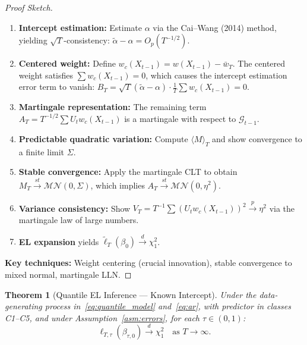 \documentclass[11pt,a4paper]{article}
\newtheorem{theorem}{Theorem}[section]
\theoremstyle{definition}
\theoremstyle{remark}
\begin{document}
\begin{proof}[Proof Sketch]
\begin{enumerate}[leftmargin=*, label=\textbf{\arabic*}.]
    \item \textbf{Intercept estimation:}
    Estimate $\alpha$ via the Cai--Wang (2014) method, yielding
    $\sqrt{T}$-consistency: $\widetilde{\alpha} - \alpha = O_p(T^{-1/2})$.
    \item \textbf{Centered weight:}
    Define $w_c(X_{t-1}) = w(X_{t-1}) - \bar{w}_T$.
    The centered weight satisfies $\sum w_c(X_{t-1}) = 0$,
    which causes the intercept estimation error term to vanish:
    $B_T = \sqrt{T}(\widetilde{\alpha} - \alpha) \cdot \frac{1}{T}\sum w_c(X_{t-1}) = 0$.
    \item \textbf{Martingale representation:}
    The remaining term $A_T = T^{-1/2}\sum U_t w_c(X_{t-1})$ is a martingale with
    respect to $\mathcal{G}_{t-1}$.
    \item \textbf{Predictable quadratic variation:}
    Compute $\langle M \rangle_T$ and show convergence to a finite limit $\Sigma$.
    \item \textbf{Stable convergence:}
    Apply the martingale CLT to obtain $M_T \xrightarrow{st} \mathcal{MN}(0, \Sigma)$,
    which implies $A_T \xrightarrow{st} \mathcal{MN}(0, \eta^2)$.
    \item \textbf{Variance consistency:}
    Show $V_T = T^{-1}\sum (U_t w_c(X_{t-1}))^2 \xrightarrow{p} \eta^2$
    via the martingale law of large numbers.
    \item \textbf{EL expansion} yields $\widetilde{\ell}_T(\beta_0) \xrightarrow{d} \chi^2_1$.
\end{enumerate}
\textbf{Key techniques:} Weight centering (crucial innovation),
stable convergence to mixed normal, martingale LLN.
\end{proof}

\begin{theorem}[Quantile EL Inference --- Known Intercept]\label{thm:4}
Under the data-generating process in~\eqref{eq:quantile_model} and~\eqref{eq:ar},
with predictor in classes C1--C5, and under Assumption~\ref{asm:errors},
for each $\tau \in (0,1)$:
\begin{equation}
    \ell_{T,\tau}(\beta_{\tau,0}) \xrightarrow{d} \chi^2_1 \quad \text{as } T \to \infty.
\end{equation}
\end{theorem}
\end{document}
